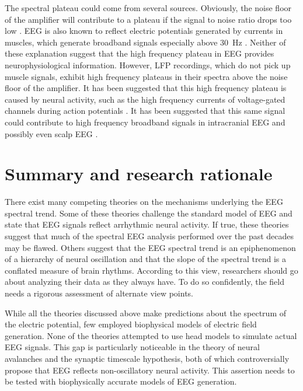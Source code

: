 The spectral plateau could come from several sources. Obviously, the noise floor of the amplifier will contribute to a plateau if the signal to noise ratio drops too low \cite{Scheer2006}. EEG is also known to reflect electric potentials generated by currents in muscles, which generate broadband signals especially above \qty{30}{\hertz} \cite{Muthukumaraswamy2013}. Neither of these explanation suggest that the high frequency plateau in EEG provides neurophysiological information. However, LFP recordings, which do not pick up muscle signals, exhibit high frequency plateaus in their spectra above the noise floor of the amplifier. It has been suggested that this high frequency plateau is caused by neural activity, such as the high frequency currents of voltage-gated channels during action potentials \cite{Ray2008, Ray2011, Gao2016, Zanos2010}. It has been suggested that this same signal could contribute to high frequency broadband signals in intracranial EEG and possibly even scalp EEG \cite{Ray2008}.

\section{Summary and research rationale}

There exist many competing theories on the mechanisms underlying the EEG spectral trend. Some of these theories challenge the standard model of EEG and state that EEG signals reflect arrhythmic neural activity. If true, these theories suggest that much of the spectral EEG analysis performed over the past decades may be flawed. Others suggest that the EEG spectral trend is an epiphenomenon of a hierarchy of neural oscillation and that the slope of the spectral trend is a conflated measure of brain rhythms. According to this view, researchers should go about analyzing their data as they always have. To do so confidently, the field needs a rigorous assessment of alternate view points.

While all the theories discussed above make predictions about the spectrum of the electric potential, few employed biophysical models of electric field generation. None of the theories attempted to use head models to simulate actual EEG signals. This gap is particularly noticeable in the theory of neural avalanches and the synaptic timescale hypothesis, both of which controversially propose that EEG reflects non-oscillatory neural activity. This assertion needs to be tested with biophysically accurate models of EEG generation.

